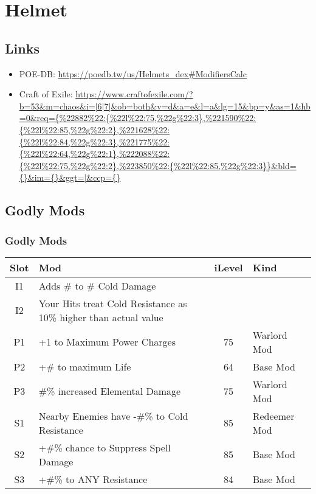 \section{Helmet}
\subsection{Links}
\begin{itemize}
	\item POE-DB: \url{https://poedb.tw/us/Helmets_dex#ModifiersCalc}
	\item Craft of Exile: \url{https://www.craftofexile.com/?b=53&m=chaos&i=|6|7|&ob=both&v=d&a=e&l=a&lg=15&bp=y&as=1&hb=0&req={%
\end{itemize}

\subsection{Godly Mods}
\subsubsection{Godly Mods}
\begin{tabular}{|c|l|c|l|}
	\hline
	Slot&Mod&iLevel&Kind\\\hline
	I1&Adds \# to \# Cold Damage&&\\\hline
	I2&Your Hits treat Cold Resistance as 10\% higher than actual value&&\\\hline
	P1& +1 to Maximum Power Charges&75& Warlord Mod \\\hline
	P2& +\# to maximum Life&64& Base Mod \\\hline
	P3& \#\% increased Elemental Damage&75& Warlord Mod \\\hline
	S1&Nearby Enemies have -\#\% to Cold Resistance&85&Redeemer Mod \\\hline
	S2&+\#\% chance to Suppress Spell Damage&85&Base Mod \\\hline
	S3&+\#\% to ANY Resistance&84&Base Mod \\\hline
\end{tabular}

